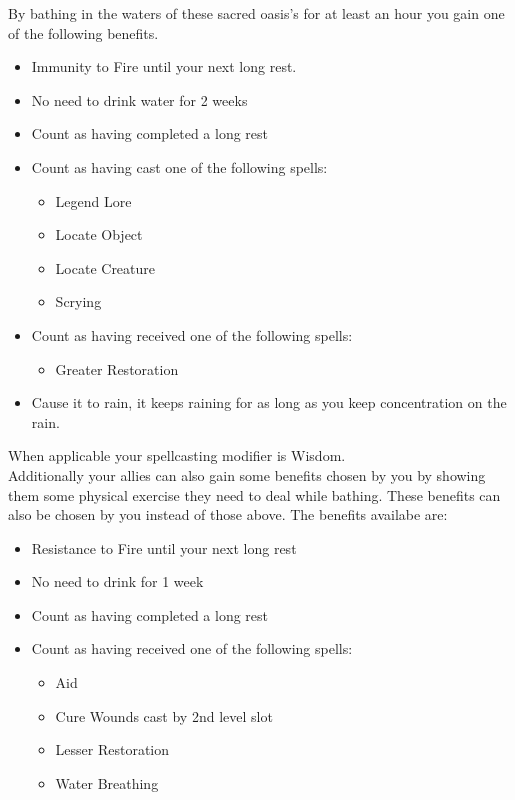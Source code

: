 \documentclass[a4paper]{article}
\begin{document}
\begin{multicols}{2}
\indent By bathing in the waters of these sacred oasis's for at least an hour you gain one of the following benefits.\\
\begin{itemize}
\item Immunity to Fire until your next long rest.
\item No need to drink water for 2 weeks
\item Count as having completed a long rest
\item Count as having cast one of the following spells:
\begin{itemize}
\item Legend Lore
\item Locate Object
\item Locate Creature
\item Scrying
\end{itemize}
\item Count as having received one of the following spells:
\begin{itemize}
\item Greater Restoration
\end{itemize}
\item Cause it to rain, it keeps raining for as long as you keep concentration on the rain.
\end{itemize}
\indent When applicable your spellcasting modifier is Wisdom.\\
\indent Additionally your allies can also gain some benefits chosen by you by showing them some physical exercise they need to deal while bathing. These benefits can also be chosen by you instead of those above. The benefits availabe are:\\
\begin{itemize}
\item Resistance to Fire until your next long rest
\item No need to drink for 1 week
\item Count as having completed a long rest
\item Count as having received one of the following spells:
\begin{itemize}
\item Aid
\item Cure Wounds cast by 2nd level slot
\item Lesser Restoration
\item Water Breathing
\end{itemize}
\end{itemize}
\end{multicols}
\end{document}
